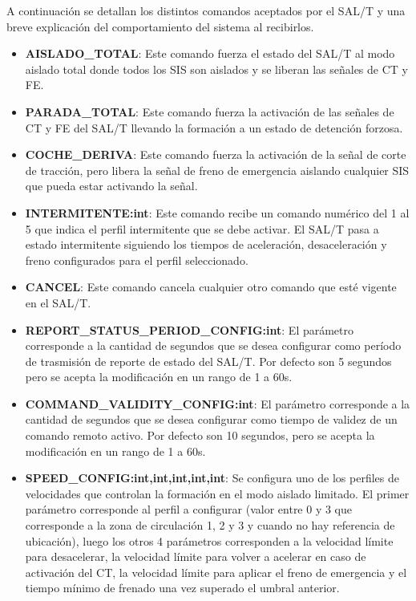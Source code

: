 A continuación se detallan los distintos comandos aceptados por el SAL/T y una breve explicación del comportamiento del sistema al recibirlos. 

\begin{itemize}
    \item \textbf{AISLADO\_TOTAL}: Este comando fuerza el estado del SAL/T al modo aislado total donde todos los SIS son aislados y se liberan las señales de CT y FE. 
    
    \item \textbf{PARADA\_TOTAL}: Este comando fuerza la activación de las señales de CT y FE del SAL/T llevando la formación a un estado de detención forzosa. 
    
    \item \textbf{COCHE\_DERIVA}: Este comando fuerza la activación de la señal de corte de tracción, pero libera la señal de freno de emergencia aislando cualquier SIS que pueda estar activando la señal. 
    
    \item \textbf{INTERMITENTE:int}: Este comando recibe un comando numérico del 1 al 5 que indica el perfil intermitente que se debe activar. El SAL/T pasa a estado intermitente siguiendo los tiempos de aceleración, desaceleración y freno configurados para el perfil seleccionado. 

    \item \textbf{CANCEL}: Este comando cancela cualquier otro comando que esté vigente en el SAL/T. 
    
    \item \textbf{REPORT\_STATUS\_PERIOD\_CONFIG:int}: El parámetro corresponde a la cantidad de segundos que se desea configurar como período de trasmisión de reporte de estado del SAL/T. Por defecto son 5 segundos pero se acepta la modificación en un rango de 1 a 60s. 
    
    \item \textbf{COMMAND\_VALIDITY\_CONFIG:int}: El parámetro corresponde a la cantidad de segundos que se desea configurar como tiempo de validez de un comando remoto activo. Por defecto son 10 segundos, pero se acepta la modificación en un rango de 1 a 60s. 
    
    \item \textbf{SPEED\_CONFIG:int,int,int,int,int}: Se configura uno de los perfiles de velocidades que controlan la formación en el modo aislado limitado. El primer parámetro corresponde al perfil a configurar (valor entre 0 y 3 que corresponde a la zona de circulación 1, 2 y 3 y cuando no hay referencia de ubicación), luego los otros 4 parámetros corresponden a la velocidad límite para desacelerar, la velocidad límite para volver a acelerar en caso de activación del CT, la velocidad límite para aplicar el freno de emergencia y el tiempo mínimo de frenado una vez superado el umbral anterior. 
    

\end{itemize}
